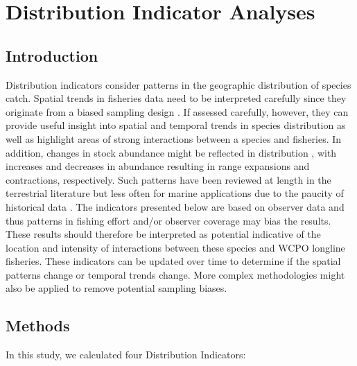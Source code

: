 \documentclass[12pt]{SCreport}
\begin{document}
             
        
\section{Distribution Indicator Analyses}
      \subsection{Introduction}

      Distribution indicators consider patterns in the geographic distribution of species catch. Spatial trends in fisheries data need to be interpreted carefully since they originate from a biased sampling design \citep{Walters2003_a}. If assessed carefully, however, they can provide useful insight into spatial and temporal trends in species distribution as well as highlight areas of strong interactions between a species and fisheries. In addition, changes in stock abundance might be reflected in distribution \citep{MacCall1990}, with increases and decreases in abundance resulting in range expansions and contractions, respectively. Such patterns have been reviewed at length in the terrestrial literature \citep{Borregaard2010_a} but less often for marine applications due to the paucity of historical data \citep[but see][]{Worm2011_a}. The indicators presented below are based on observer data and thus patterns in fishing effort and/or observer coverage may bias the results.  These results should therefore be interpreted as potential indicative of the location and intensity of interactions between these species and WCPO longline fisheries.  These indicators can be updated over time to determine if the spatial patterns change or temporal trends change.  More complex methodologies might also be applied to remove potential sampling biases.
      
      
      \subsection{Methods}
      In this study, we calculated four Distribution Indicators:
      
\end{document}

